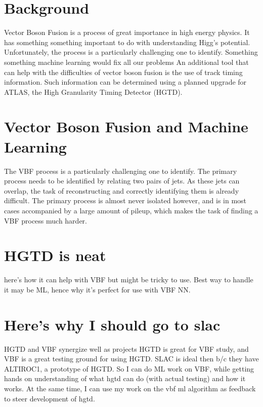 \documentclass[paper=a4,fontsize=12pt]{article}
\begin{document}
\section*{Background}
    Vector Boson Fusion is a process of great importance in high energy physics.
    It has something something important to do with understanding Higg's potential. %
    Unfortunately, the process is a particularly challenging one to identify.
    Something something machine learning would fix all our problems %
    An additional tool that can help with the difficulties of vector boson fusion is the use of track timing information. Such information can be determined using a planned upgrade for ATLAS, the High Granularity Timing Detector (HGTD).






\section*{Vector Boson Fusion and Machine Learning}
    The VBF process is a particularly challenging one to identify. The primary process needs to be identified by relating two pairs of jets. As these jets can overlap, the task of reconstructing and correctly identifying them is already difficult. The primary process is almost never isolated however, and is in most cases accompanied by a large amount of pileup, which makes the task of finding a VBF process much harder. 


\section*{HGTD is neat}
    here's how it can help with VBF 
    but might be tricky to use.
    Best way to handle it may be ML,
    hence why it's perfect for use with VBF NN. 


\section*{Here's why I should go to slac}
    HGTD and VBF synergize well as projects
    HGTD is great for VBF study, and VBF is a great testing ground for using HGTD.
    SLAC is ideal then b/c they have ALTIROC1, a prototype of HGTD.
    So I can do ML work on VBF, while getting hands on understanding of what hgtd can do (with actual testing) and how it works.
    At the same time, I can use my work on the vbf ml algorithm as feedback to steer development of hgtd.
\end{document}
